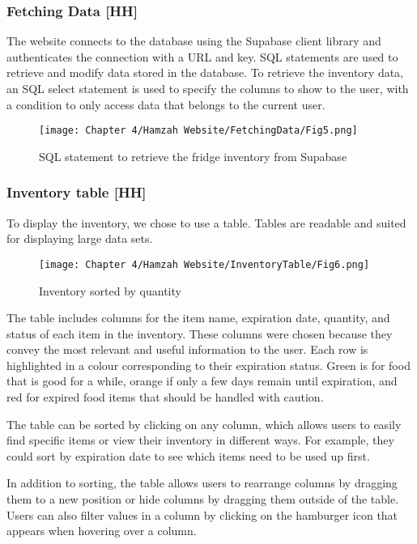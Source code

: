 \subsubsection{Fetching Data [HH]}

The website connects to the database using the Supabase client library and authenticates the connection with a URL and key.
SQL statements are used to retrieve and modify data stored in the database.
To retrieve the inventory data, an SQL select statement is used to specify the columns to show to the user, with a condition to only access data that belongs to the current user.

\begin{figure}[H]        
    \centering
    \texttt{[image: Chapter 4/Hamzah Website/FetchingData/Fig5.png]}
    \caption{SQL statement to retrieve the fridge inventory from Supabase}
\end{figure} 

\subsubsection{Inventory table [HH]}

To display the inventory, we chose to use a table.
Tables are readable and suited for displaying large data sets.

\begin{figure}[H]        
    \centering
    \texttt{[image: Chapter 4/Hamzah Website/InventoryTable/Fig6.png]}
    \caption{Inventory sorted by quantity}
\end{figure} 

The table includes columns for the item name, expiration date, quantity, and status of each item in the inventory.
These columns were chosen because they convey the most relevant and useful information to the user.
Each row is highlighted in a colour corresponding to their expiration status.
Green is for food that is good for a while, orange if only a few days remain until expiration, and red for expired food items that should be handled with caution.

The table can be sorted by clicking on any column, which allows users to easily find specific items or view their inventory in different ways.
For example, they could sort by expiration date to see which items need to be used up first.

In addition to sorting, the table allows users to rearrange columns by dragging them to a new position or hide columns by dragging them outside of the table.
Users can also filter values in a column by clicking on the hamburger icon that appears when hovering over a column.

